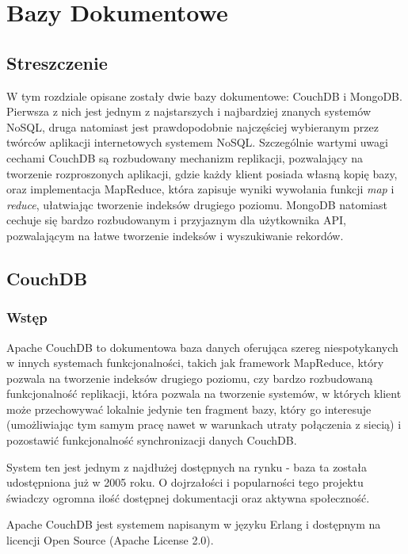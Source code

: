 \chapter{Bazy Dokumentowe}

\section*{Streszczenie}
W tym rozdziale opisane zostały dwie bazy dokumentowe: CouchDB i MongoDB.
Pierwsza z nich jest jednym z najstarszych i najbardziej znanych systemów NoSQL, druga natomiast jest prawdopodobnie najczęściej wybieranym przez twórców aplikacji internetowych systemem NoSQL.
Szczególnie wartymi uwagi cechami CouchDB są rozbudowany mechanizm replikacji, pozwalający na tworzenie rozproszonych aplikacji, gdzie każdy klient posiada własną kopię bazy, oraz implementacja MapReduce, która zapisuje wyniki wywołania funkcji \emph{map} i \emph{reduce}, ułatwiając tworzenie indeksów drugiego poziomu.
MongoDB natomiast cechuje się bardzo rozbudowanym i przyjaznym dla użytkownika API, pozwalającym na łatwe tworzenie indeksów i wyszukiwanie rekordów.

\section{CouchDB}
\label{sec:couchdb}

\subsection*{Wstęp}

Apache CouchDB to dokumentowa baza danych oferująca szereg niespotykanych w innych systemach funkcjonalności, takich jak framework MapReduce, który pozwala na tworzenie indeksów drugiego poziomu, czy bardzo rozbudowaną funkcjonalność replikacji, która pozwala na tworzenie systemów, w których klient może przechowywać lokalnie jedynie ten fragment bazy, który go interesuje (umożliwiając tym samym pracę nawet w warunkach utraty połączenia z siecią) i pozostawić funkcjonalność synchronizacji danych CouchDB.

System ten jest jednym z najdłużej dostępnych na rynku - baza ta została udostępniona już w 2005 roku.
O dojrzałości i popularności tego projektu świadczy ogromna ilość dostępnej dokumentacji oraz aktywna społeczność.

Apache CouchDB jest systemem napisanym w języku Erlang i dostępnym na licencji Open Source (Apache License 2.0).

